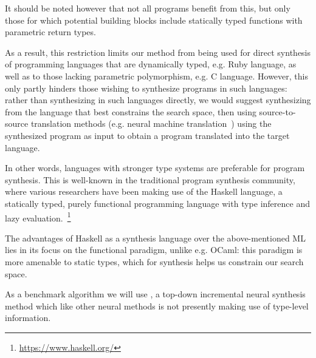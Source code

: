\documentclass{article}
\begin{document}
It should be noted however that not all programs benefit from this, but only those for which potential building blocks include statically typed functions with parametric return types.

As a result, this restriction limits our method from being used for direct synthesis of programming languages that are dynamically typed, e.g. Ruby language, as well as to those lacking parametric polymorphism, e.g. C language.
However, this only partly hinders those wishing to synthesize programs in such languages: rather than synthesizing in such languages directly, we would suggest synthesizing from the language that best constrains the search space, then using source-to-source translation methods (e.g. neural machine translation~\citep{kalchbrenner2013recurrent})
using the synthesized program as input to obtain a program translated into the target language.

In other words, languages with stronger type systems are preferable for program synthesis.
This is well-known in the traditional program synthesis community, where various researchers
have been making use of the Haskell language, a statically typed, purely functional programming language with type inference and lazy evaluation.~\footnote{\url{https://www.haskell.org/}}

The advantages of Haskell as a synthesis language over the above-mentioned ML lies in its focus on the functional paradigm, unlike e.g. OCaml: this paradigm is more amenable to static types, which for synthesis helps us constrain our search space.


As a benchmark algorithm we will use \cite{nsps}, a top-down incremental neural synthesis method which like other neural methods is not presently making use of type-level information.
\end{document}
